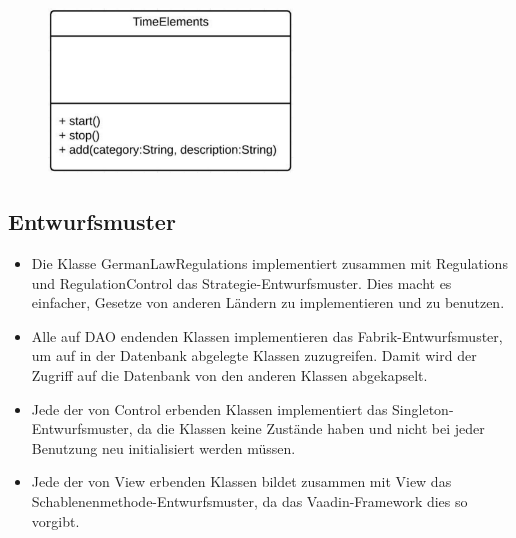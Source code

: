 \begin{itemize}
            
                                                    \begin{figure}[htb]
                    \centering
                    \includegraphics[width=6.5cm]{Diagramms/class/singleclass/ViewTE.pdf}
                    \end{figure}
                    \newline
            \begin{itemize}
            \end{itemize}

        \end{itemize}

    \subsection{Entwurfsmuster}
        \begin{itemize}
            \item Die Klasse GermanLawRegulations implementiert zusammen mit Regulations und RegulationControl das Strategie-Entwurfsmuster.
                Dies macht es einfacher, Gesetze von anderen Ländern zu implementieren und zu benutzen.
            \item Alle auf DAO endenden Klassen implementieren das Fabrik-Entwurfsmuster, um auf in der Datenbank abgelegte Klassen zuzugreifen.
                Damit wird der Zugriff auf die Datenbank von den anderen Klassen abgekapselt.
            \item Jede der von Control erbenden Klassen implementiert das Singleton-Entwurfsmuster, da die Klassen keine Zustände haben und nicht bei jeder Benutzung neu initialisiert werden müssen.
            \item Jede der von View erbenden Klassen bildet zusammen mit View das Schablenenmethode-Entwurfsmuster, da das Vaadin-Framework dies so vorgibt.
        \end{itemize}
